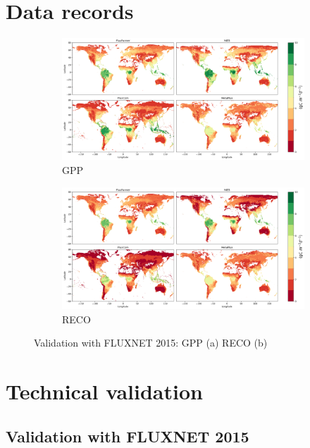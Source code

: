 \section{Data records}
\begin{figure}[p]
    \centering
    \begin{subfigure}{\textwidth}
      \centering
      \includegraphics[width=\textwidth]{figs/chap6/GPP_2017_mean.png}
      \caption{GPP}
      \label{fig:chap6_fig2a}
    \end{subfigure}

    \begin{subfigure}{\textwidth}
      \centering
      \includegraphics[width=\textwidth]{figs/chap6/RECO_2017_mean.png}
      \caption{RECO}
      \label{fig:chap6_fig2b}
    \end{subfigure}
    \caption[Validation with FLUXNET 2015]{Validation with FLUXNET 2015: GPP (a) RECO (b)}
    \label{fig:chap6_fig2}
\end{figure}

\section{Technical validation}
\subsection{Validation with FLUXNET 2015}
